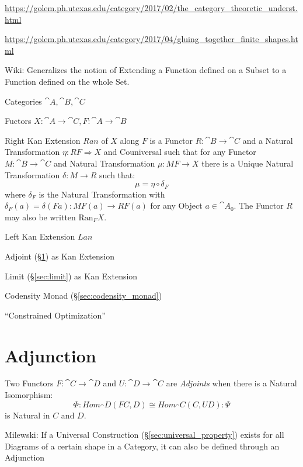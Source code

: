 \url{https://golem.ph.utexas.edu/category/2017/02/the_category_theoretic_underst.html}

\url{https://golem.ph.utexas.edu/category/2017/04/gluing_together_finite_shapes.html}

Wiki: Generalizes the notion of Extending a Function defined on a
Subset to a Function defined on the whole Set.

Categories $\cat{A}, \cat{B}, \cat{C}$

Fuctors $X : \cat{A} \rightarrow \cat{C}, F : \cat{A} \rightarrow
\cat{B}$

Right Kan Extension $Ran$ of $X$ along $F$ is a Functor $R : \cat{B}
\rightarrow \cat{C}$ and a Natural Transformation $\eta : RF
\Rightarrow X$ and Couniversal such that for any Functor $M : \cat{B}
\rightarrow \cat{C}$ and Natural Transformation $\mu : MF \rightarrow
X$ there is a Unique Natural Transformation $\delta : M \rightarrow R$
such that:
\[
  \mu = \eta \circ \delta_F
\]
where $\delta_F$ is the Natural Transformation with $\delta_F(a) =
\delta (F a) : M F(a) \rightarrow RF(a)$ for any Object $a \in
\cat{A}_0$. The Functor $R$ may also be written $\mathrm{Ran}_F X$.

Left Kan Extension $Lan$

Adjoint (\S\ref{sec:adjunction}) as Kan Extension

Limit (\S\ref{sec:limit}) as Kan Extension

Codensity Monad (\S\ref{sec:codensity_monad})

``Constrained Optimization'' %



\section{Adjunction}\label{sec:adjunction}


Two Functors $F : \cat{C} \rightarrow \cat{D}$ and $U : \cat{D}
\rightarrow \cat{C}$ are \emph{Adjoints} when there is a Natural
Isomorphism:
\[
  \Phi : Hom_\cat{D}(F C,D) \cong Hom_\cat{C}(C,U D) : \Psi
\]
is Natural in $C$ and $D$.


Milewski: If a Universal Construction (\S\ref{sec:universal_property})
exists for all Diagrams of a certain shape in a Category, it can also
be defined through an Adjunction

